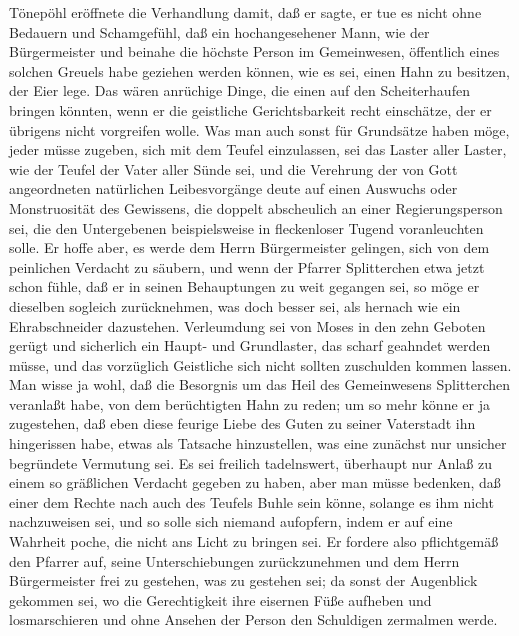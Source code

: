 Tönepöhl eröffnete die Verhandlung damit, daß er sagte, er tue es
nicht ohne Bedauern und Schamgefühl, daß ein hochangesehener Mann,
wie der Bürgermeister und beinahe die höchste Person im
Gemeinwesen, öffentlich eines solchen Greuels habe geziehen werden
können, wie es sei, einen Hahn zu besitzen, der Eier lege. Das
wären anrüchige Dinge, die einen auf den Scheiterhaufen bringen
könnten, wenn er die geistliche Gerichtsbarkeit recht einschätze,
der er übrigens nicht vorgreifen wolle. Was man auch sonst für
Grundsätze haben möge, jeder müsse zugeben, sich mit dem Teufel
einzulassen, sei das Laster aller Laster, wie der Teufel
\pagenum{[24]} der Vater aller Sünde sei, und die Verehrung der von
Gott angeordneten natürlichen Leibesvorgänge deute auf einen
Auswuchs oder Monstruosität des Gewissens, die doppelt abscheulich
an einer Regierungsperson sei, die den Untergebenen beispielsweise
in fleckenloser Tugend voranleuchten solle. Er hoffe aber, es werde
dem Herrn Bürgermeister gelingen, sich von dem peinlichen Verdacht
zu säubern, und wenn der Pfarrer Splitterchen etwa jetzt schon
fühle, daß er in seinen Behauptungen zu weit gegangen sei, so möge
er dieselben sogleich zurücknehmen, was doch besser sei, als
hernach wie ein Ehrabschneider dazustehen. Verleumdung sei von
Moses in den zehn Geboten gerügt und sicherlich ein Haupt- und
Grundlaster, das scharf geahndet werden müsse, und das vorzüglich
Geistliche sich nicht sollten zuschulden kommen lassen. Man wisse
ja wohl, daß die Besorgnis um das Heil des Gemeinwesens
Splitterchen veranlaßt habe, von dem berüchtigten Hahn zu reden; um
so mehr könne er ja zugestehen, daß eben diese feurige Liebe des
Guten zu seiner Vaterstadt ihn hingerissen habe, etwas als Tatsache
hinzustellen, was eine zunächst nur unsicher begründete Vermutung
sei. Es sei freilich tadelnswert, überhaupt nur Anlaß zu einem so
gräßlichen Verdacht gegeben zu haben, aber man müsse bedenken, daß
einer dem Rechte nach auch des Teufels Buhle sein könne, solange es
ihm nicht nachzuweisen sei, und so solle sich niemand aufopfern,
indem er auf eine Wahrheit poche, die nicht ans Licht zu bringen
sei. Er fordere also pflichtgemäß den Pfarrer auf, seine
Unterschiebungen zurückzunehmen und dem Herrn Bürgermeister frei zu
gestehen, was zu gestehen sei; da sonst der Augenblick gekommen
sei, wo die Gerechtigkeit ihre eisernen Füße aufheben und
losmarschieren \pagenum{[25]} und ohne Ansehen der Person den
Schuldigen zermalmen werde.

